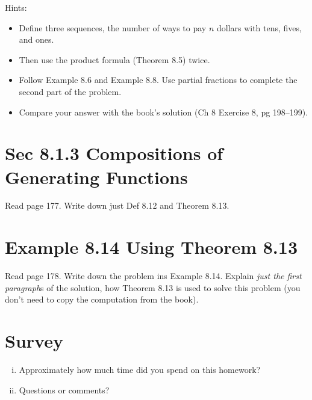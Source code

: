 \documentclass[12pt]{amsart}
\begin{document}
 Hints:
\begin{itemize}
\item Define three sequences, the number of ways to pay $n$ dollars with tens, fives, and ones.
 \item Then use the product formula (Theorem 8.5) twice. 
 \item Follow Example 8.6 and Example 8.8. Use partial fractions to complete the second part of the problem. 
\item 
Compare your answer with the book's solution (Ch 8 Exercise 8, pg 198--199).
\end{itemize}




\section{Sec 8.1.3 Compositions of Generating Functions}

Read page 177. Write down just Def 8.12 and Theorem 8.13.


\section{Example 8.14 Using Theorem 8.13}

Read page 178. 
Write down the problem ins Example 8.14. Explain \emph{just the first paragraph}s of the solution, how Theorem 8.13 is used to solve this problem (you don't need to copy the computation from the book).



\section{Survey}
\begin{enumerate}[i.] 
\item Approximately how much time did you spend on this homework?
\item Questions or comments?
\end{enumerate}
\end{document}

